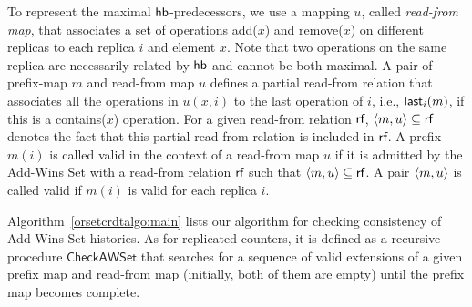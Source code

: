 To represent the maximal $\textsf{hb}$-predecessors, we use a mapping $u$, called \emph{read-from map}, that associates a set of operations {\sf add}($x$) and {\sf remove}($x$) on different replicas to each replica $i$ and element $x$. Note that two operations on the same replica are necessarily related by $\textsf{hb}$ and cannot be both maximal. A pair of prefix-map $m$ and read-from map $u$ defines a partial read-from relation that associates all the operations in $u(x,i)$ to the last operation of $i$, i.e., ${\sf last}_i(m)$, if this is a {\sf contains}($x$) operation. For a given read-from relation $\textsf{rf}$, ${\left\langle{m,u}\right\rangle}\subseteq \textsf{rf}$ denotes the fact that this partial read-from relation is included in $\textsf{rf}$. A prefix $m(i)$ is called valid in the context of a read-from map $u$ if it is admitted by the Add-Wins Set with a read-from relation $\textsf{rf}$ such that ${\left\langle{m,u}\right\rangle}\subseteq \textsf{rf}$. A pair ${\left\langle{m,u}\right\rangle}$ is called valid if $m(i)$ is valid for each replica $i$.

Algorithm~\ref{orsetcrdtalgo:main} lists our algorithm for checking consistency of Add-Wins Set histories. As for replicated counters, it is defined as a recursive procedure $\mathsf{CheckAWSet}$ that searches for a sequence of valid extensions of a given prefix map and read-from map (initially, both of them are empty) until the prefix map becomes complete.

